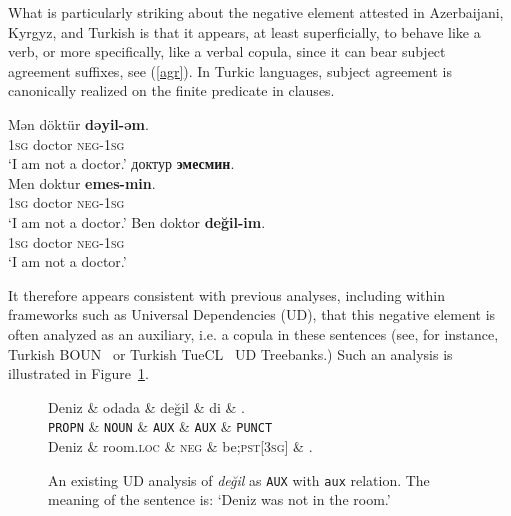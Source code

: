 \documentclass[10pt, a4paper]{article}
\newcommand{\cyr}[1]{{\fontencoding{T2A}\selectfont #1}}
\newcommand{\gl}[1]{\textsc{#1}}
\newcommand{\upos}[1]{\texttt{#1}}
\newcommand{\rel}[1]{\texttt{#1}}
\begin{document}
What is particularly striking about the negative element attested in Azerbaijani, Kyrgyz, and Turkish is that it appears, at least superficially, to behave like a verb, or more specifically, like a verbal copula, since it can bear subject agreement suffixes, see (\ref{agr}).
In Turkic languages, subject agreement is canonically realized on the finite predicate in clauses.

\begin{exe}
  \ex\label{agr}
  \begin{xlist}
    \ex\label{agr-az}
    \gll Mən döktür \textbf{dəyil-əm}.\\
    1\gl{sg} doctor \gl{neg}-1\gl{sg}\\
    \glt `I am not a doctor.'
    \ex\label{agr-ky}
    \glll \cyr{Мен} \cyr{доктур} \cyr{\textbf{эмесмин}}.\\
    Men doktur \textbf{emes-min}.\\
    1\gl{sg} doctor \gl{neg}-1\gl{sg}\\
    \glt `I am not a doctor.'
    \ex\label{agr-tr}
    \gll Ben doktor \textbf{değil-im}.\\
    1\gl{sg} doctor \gl{neg}-1\gl{sg}\\
    \glt `I am not a doctor.'
  \end{xlist}
\end{exe}

It therefore appears consistent with previous analyses, including within frameworks such as Universal Dependencies (UD), that this negative element is often analyzed as an auxiliary, i.e. a copula in these sentences (see, for instance, Turkish BOUN~ or Turkish TueCL~ UD Treebanks.)
Such an analysis is illustrated in Figure~\ref{fig:existing-tree}.

\begin{figure}[ht]
  \centering
  \begin{dependency}
    \begin{deptext}[column sep=-0.1em]
      Deniz \& odada \& değil \& di \& .\\
      \footnotesize \upos{PROPN} \& \footnotesize \upos{NOUN} \& \footnotesize \upos{AUX}  \& \footnotesize \upos{AUX} \& \footnotesize \upos{PUNCT} \\
      \footnotesize Deniz \& \footnotesize room.\gl{loc} \& \gl{neg} \& \footnotesize be;\gl{pst}[3\gl{sg}] \& . \\
    \end{deptext}
  \end{dependency}
  \caption{
    An existing UD analysis of \emph{de\u{g}il} as \upos{AUX} with \rel{aux} relation.
    The meaning of the sentence is: `Deniz was not in the room.'
  }
  \label{fig:existing-tree}
\end{figure}
\end{document}
